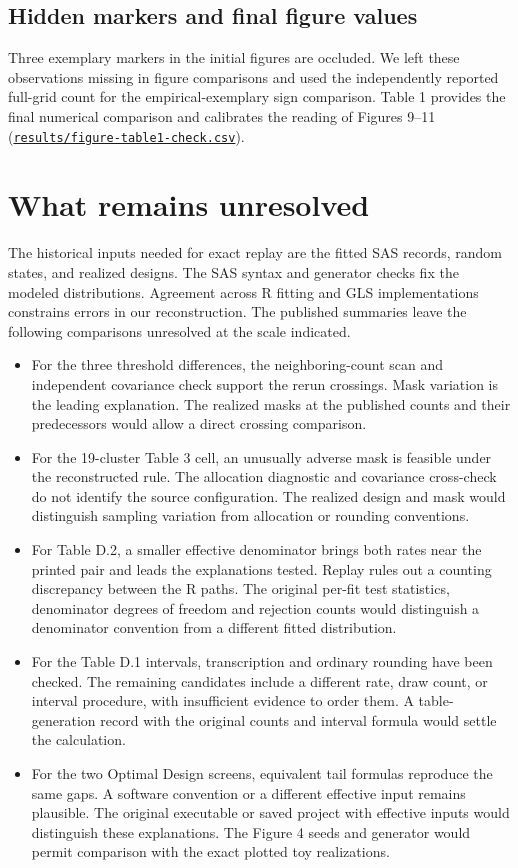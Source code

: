 \subsection{Hidden markers and final figure values}
Three exemplary markers in the initial figures are occluded. We left these observations missing in figure comparisons and used the independently reported full-grid count for the empirical-exemplary sign comparison. Table 1 provides the final numerical comparison and calibrates the reading of Figures 9--11 (\href{https://github.com/alectionary/vibe-math/blob/master/formalization/kupzyk-power-assumptions/results/figure-table1-check.csv}{\nolinkurl{results/figure-table1-check.csv}}).

\section{What remains unresolved}\label{sec:unresolved}
The historical inputs needed for exact replay are the fitted SAS records, random states, and realized designs. The SAS syntax and generator checks fix the modeled distributions. Agreement across R fitting and GLS implementations constrains errors in our reconstruction. The published summaries leave the following comparisons unresolved at the scale indicated.

\begin{itemize}
\item For the three threshold differences, the neighboring-count scan and independent covariance check support the rerun crossings. Mask variation is the leading explanation. The realized masks at the published counts and their predecessors would allow a direct crossing comparison.
\item For the 19-cluster Table 3 cell, an unusually adverse mask is feasible under the reconstructed rule. The allocation diagnostic and covariance cross-check do not identify the source configuration. The realized design and mask would distinguish sampling variation from allocation or rounding conventions.
\item For Table D.2, a smaller effective denominator brings both rates near the printed pair and leads the explanations tested. Replay rules out a counting discrepancy between the R paths. The original per-fit test statistics, denominator degrees of freedom and rejection counts would distinguish a denominator convention from a different fitted distribution.
\item For the Table D.1 intervals, transcription and ordinary rounding have been checked. The remaining candidates include a different rate, draw count, or interval procedure, with insufficient evidence to order them. A table-generation record with the original counts and interval formula would settle the calculation.
\item For the two Optimal Design screens, equivalent tail formulas reproduce the same gaps. A software convention or a different effective input remains plausible. The original executable or saved project with effective inputs would distinguish these explanations. The Figure 4 seeds and generator would permit comparison with the exact plotted toy realizations.
\end{itemize}


